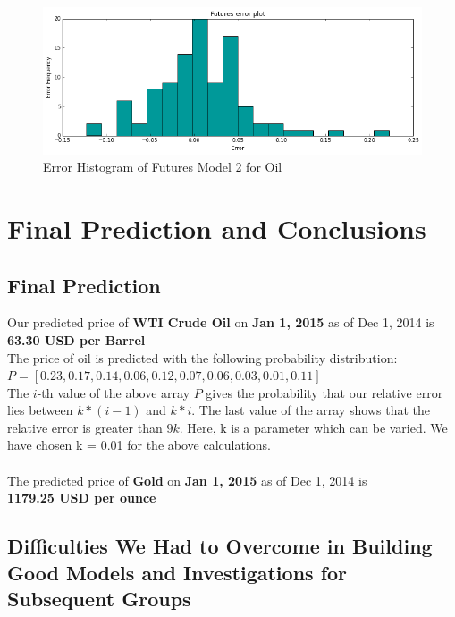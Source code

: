 \documentclass[runningheads]{llncs}
\begin{document}
\begin{figure}
\centering
\includegraphics[width=\textwidth]{futures_oil2.png}
\caption{Error Histogram of Futures Model 2 for Oil}
\label{fig:futures_oil2.png}
\end{figure}


\newpage
\section{Final Prediction and Conclusions}
\subsection {Final Prediction}
\noindent Our predicted price of \textbf{WTI Crude Oil} on \textbf{Jan 1, 2015} as of Dec 1, 2014 is \\
\textbf{63.30 USD per Barrel} \\

\noindent The price of oil is predicted with the following probability distribution: \\
$P = [0.23, 0.17, 0.14, 0.06, 0.12, 0.07, 0.06, 0.03, 0.01, 0.11]$\\

The $i$-th value of the above array $P$ gives the probability that our relative error lies between $k*(i-1)$ and $k*i$. The last value of the array shows that the relative error is greater than $9k$.
Here, k is a parameter which can be varied. We have chosen k = 0.01 for the above calculations.\\\\

\noindent The predicted price of \textbf{Gold} on \textbf{Jan 1, 2015} as of Dec 1, 2014 is \\
\textbf{1179.25 USD per ounce} \\

\subsection {Difficulties We Had to Overcome in Building Good Models and Investigations for Subsequent Groups}
\end{document}
